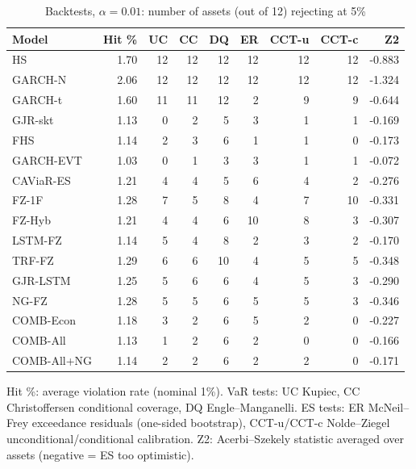 \begin{table}[htbp]
\centering
\footnotesize
\caption{Backtests, $\alpha=0.01$: number of assets (out of 12) rejecting at 5\%}
\label{tab:bt_a010}
\begin{tabular}{lrrrrrrrr}
\toprule
Model & Hit \% & UC & CC & DQ & ER & CCT-u & CCT-c & Z2 \\
\midrule
HS & 1.70 & 12 & 12 & 12 & 12 & 12 & 12 & -0.883 \\
GARCH-N & 2.06 & 12 & 12 & 12 & 12 & 12 & 12 & -1.324 \\
GARCH-t & 1.60 & 11 & 11 & 12 & 2 & 9 & 9 & -0.644 \\
GJR-skt & 1.13 & 0 & 2 & 5 & 3 & 1 & 1 & -0.169 \\
FHS & 1.14 & 2 & 3 & 6 & 1 & 1 & 0 & -0.173 \\
GARCH-EVT & 1.03 & 0 & 1 & 3 & 3 & 1 & 1 & -0.072 \\
CAViaR-ES & 1.21 & 4 & 4 & 5 & 6 & 4 & 2 & -0.276 \\
FZ-1F & 1.28 & 7 & 5 & 8 & 4 & 7 & 10 & -0.331 \\
FZ-Hyb & 1.21 & 4 & 4 & 6 & 10 & 8 & 3 & -0.307 \\
LSTM-FZ & 1.14 & 5 & 4 & 8 & 2 & 3 & 2 & -0.170 \\
TRF-FZ & 1.29 & 6 & 6 & 10 & 4 & 5 & 5 & -0.348 \\
GJR-LSTM & 1.25 & 5 & 6 & 6 & 4 & 5 & 3 & -0.290 \\
NG-FZ & 1.28 & 5 & 5 & 6 & 5 & 5 & 3 & -0.346 \\
COMB-Econ & 1.18 & 3 & 2 & 6 & 5 & 2 & 0 & -0.227 \\
COMB-All & 1.13 & 1 & 2 & 6 & 2 & 0 & 0 & -0.166 \\
COMB-All+NG & 1.14 & 2 & 2 & 6 & 2 & 2 & 0 & -0.171 \\
\bottomrule
\end{tabular}
\par\smallskip\parbox{\linewidth}{\scriptsize Hit \%: average violation rate (nominal 1\%). VaR tests: UC Kupiec, CC Christoffersen conditional coverage, DQ Engle--Manganelli. ES tests: ER McNeil--Frey exceedance residuals (one-sided bootstrap), CCT-u/CCT-c Nolde--Ziegel unconditional/conditional calibration. Z2: Acerbi--Szekely statistic averaged over assets (negative = ES too optimistic).}
\end{table}